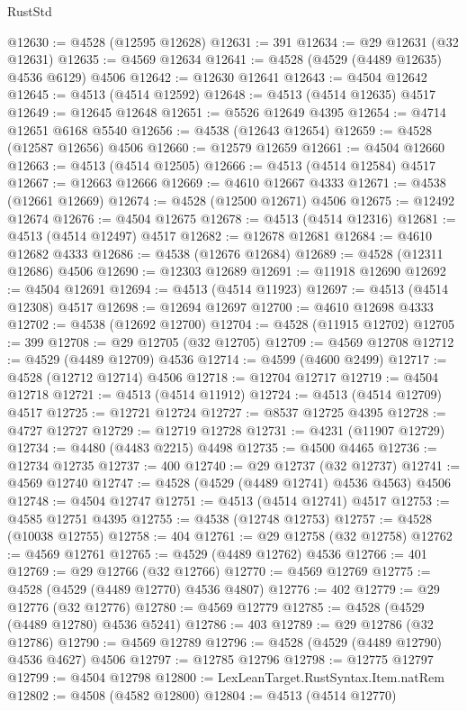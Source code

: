 \begin{lexlean}{RustStd}
\begin{coremodule}
@12630 := @4528 (@12595 @12628)
@12631 := 391
@12634 := @29 @12631 (@32 @12631)
@12635 := @4569 @12634
@12641 := @4528 (@4529 (@4489 @12635) @4536 @6129) @4506
@12642 := @12630 @12641
@12643 := @4504 @12642
@12645 := @4513 (@4514 @12592)
@12648 := @4513 (@4514 @12635) @4517
@12649 := @12645 @12648
@12651 := @5526 @12649 @4395
@12654 := @4714 @12651 @6168 @5540
@12656 := @4538 (@12643 @12654)
@12659 := @4528 (@12587 @12656) @4506
@12660 := @12579 @12659
@12661 := @4504 @12660
@12663 := @4513 (@4514 @12505)
@12666 := @4513 (@4514 @12584) @4517
@12667 := @12663 @12666
@12669 := @4610 @12667 @4333
@12671 := @4538 (@12661 @12669)
@12674 := @4528 (@12500 @12671) @4506
@12675 := @12492 @12674
@12676 := @4504 @12675
@12678 := @4513 (@4514 @12316)
@12681 := @4513 (@4514 @12497) @4517
@12682 := @12678 @12681
@12684 := @4610 @12682 @4333
@12686 := @4538 (@12676 @12684)
@12689 := @4528 (@12311 @12686) @4506
@12690 := @12303 @12689
@12691 := @11918 @12690
@12692 := @4504 @12691
@12694 := @4513 (@4514 @11923)
@12697 := @4513 (@4514 @12308) @4517
@12698 := @12694 @12697
@12700 := @4610 @12698 @4333
@12702 := @4538 (@12692 @12700)
@12704 := @4528 (@11915 @12702)
@12705 := 399
@12708 := @29 @12705 (@32 @12705)
@12709 := @4569 @12708
@12712 := @4529 (@4489 @12709) @4536
@12714 := @4599 (@4600 @2499)
@12717 := @4528 (@12712 @12714) @4506
@12718 := @12704 @12717
@12719 := @4504 @12718
@12721 := @4513 (@4514 @11912)
@12724 := @4513 (@4514 @12709) @4517
@12725 := @12721 @12724
@12727 := @8537 @12725 @4395
@12728 := @4727 @12727
@12729 := @12719 @12728
@12731 := @4231 (@11907 @12729)
@12734 := @4480 (@4483 @2215) @4498
@12735 := @4500 @4465
@12736 := @12734 @12735
@12737 := 400
@12740 := @29 @12737 (@32 @12737)
@12741 := @4569 @12740
@12747 := @4528 (@4529 (@4489 @12741) @4536 @4563) @4506
@12748 := @4504 @12747
@12751 := @4513 (@4514 @12741) @4517
@12753 := @4585 @12751 @4395
@12755 := @4538 (@12748 @12753)
@12757 := @4528 (@10038 @12755)
@12758 := 404
@12761 := @29 @12758 (@32 @12758)
@12762 := @4569 @12761
@12765 := @4529 (@4489 @12762) @4536
@12766 := 401
@12769 := @29 @12766 (@32 @12766)
@12770 := @4569 @12769
@12775 := @4528 (@4529 (@4489 @12770) @4536 @4807)
@12776 := 402
@12779 := @29 @12776 (@32 @12776)
@12780 := @4569 @12779
@12785 := @4528 (@4529 (@4489 @12780) @4536 @5241)
@12786 := 403
@12789 := @29 @12786 (@32 @12786)
@12790 := @4569 @12789
@12796 := @4528 (@4529 (@4489 @12790) @4536 @4627) @4506
@12797 := @12785 @12796
@12798 := @12775 @12797
@12799 := @4504 @12798
@12800 := LexLeanTarget.RustSyntax.Item.natRem
@12802 := @4508 (@4582 @12800)
@12804 := @4513 (@4514 @12770)

\end{coremodule}
\end{lexlean}

